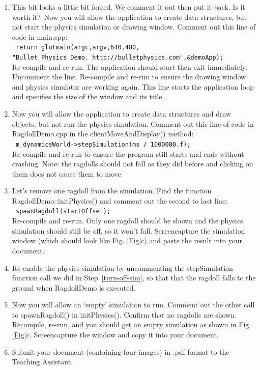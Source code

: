 \documentclass[12pt]{article}
\begin{document}
\begin{enumerate}
\item \color{red}This bit looks a little bit forced.  We comment it out then put it back. Is it worth it?\color{black}\ Now you will allow the application to create data structures, but not start the physics simulation or drawing window.  Comment out this line of code in main.cpp: \\
\texttt{ return glutmain(argc,argv,640,480,\\"Bullet Physics Demo. http://bulletphysics.com",\&demoApp);} \\
Re-compile and re-run.  The application should start then exit immediately. Uncomment the line.  Re-compile and re-run to ensure the drawing window and physics simulator are working again. This line starts the application loop and specifies the size of the window and its title.  

\item \label{turn-off-sim} Now you will allow the application to create data structures and draw objects, but not run the physics simulation.  Comment out this line of code in RagdollDemo.cpp in the clientMoveAndDisplay() method: \\
\texttt{ m\_dynamicsWorld->stepSimulation(ms / 1000000.f);} \\
Re-compile and re-run to ensure the program still starts and ends without crashing.  Note: the ragdolls should not fall as they did before and clicking on them does not cause them to move.

\item Let's remove one ragdoll from the simulation.  Find the function RagdollDemo::initPhysics() and comment out the second to last line: \\
\texttt{	spawnRagdoll(startOffset);} \\
Re-compile and re-run.  Only one ragdoll should be shown and the physics simulation should still be off, so it won't fall.  Screencapture the simulation window (which should look like Fig. \ref{Fig}c) and paste the result into your document.

\item Re-enable the physics simulation by uncommenting the stepSimulation function call we did in Step~\ref{turn-off-sim}, so that that the ragdoll falls to the ground when RagdollDemo is executed.

\item Now you will allow an `empty' simulation to run.  Comment out the other call to spawnRagdoll() in initPhysics().  Confirm that no ragdolls are shown.  Recompile, re-run, and you should get an empty simulation as shown in Fig. \ref{Fig}c. Screencapture the window and copy it into your document.

\item Submit your document (containing four images) in .pdf format to the Teaching Assistant.

\end{enumerate}
\end{document}
